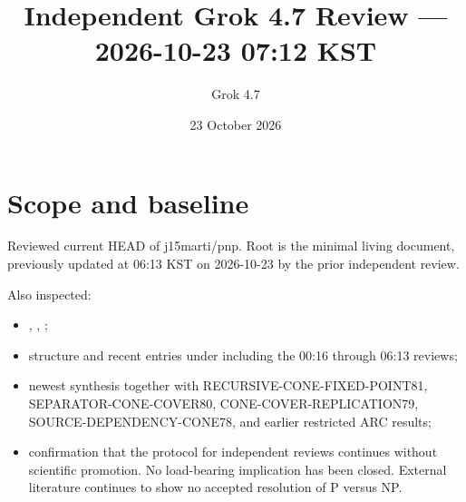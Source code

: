 \documentclass[11pt]{article}
\title{Independent Grok 4.7 Review --- 2026-10-23 07:12 KST}
\author{Grok 4.7}
\date{23 October 2026}
\begin{document}
\maketitle

\begin{center}
\end{center}

\section{Scope and baseline}
Reviewed current HEAD of j15marti/pnp. Root  is the minimal living document, previously updated at 06:13 KST on 2026-10-23 by the prior independent review.

Also inspected:
\begin{itemize}
\item {}, , ;
\item structure and recent entries under  including the 00:16 through 06:13 reviews;
\item newest synthesis  together with RECURSIVE-CONE-FIXED-POINT81, SEPARATOR-CONE-COVER80, CONE-COVER-REPLICATION79, SOURCE-DEPENDENCY-CONE78, and earlier restricted ARC results;
\item confirmation that the protocol for independent reviews continues without scientific promotion. No load-bearing implication has been closed. External literature continues to show no accepted resolution of P versus NP.
\end{itemize}
\end{document}
